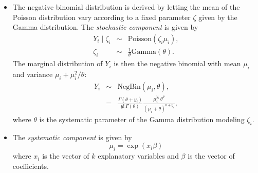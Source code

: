 \begin{itemize}
\item The negative binomial distribution is derived by letting the
  mean of the Poisson distribution vary according to a fixed
  parameter $\zeta$ given by the Gamma distribution. The
  \emph{stochastic component} is given by
   \begin{eqnarray*}
     Y_i \mid \zeta_i & \sim & \textrm{Poisson}(\zeta_i \mu_i),\\
     \zeta_i & \sim & \frac{1}{\theta}\textrm{Gamma}(\theta).
   \end{eqnarray*}
   The marginal distribution of $Y_i$ is then the negative binomial
   with mean $\mu_i$ and variance $\mu_i + \mu_i^2/\theta$:
   \begin{eqnarray*}
   Y_i & \sim & \textrm{NegBin}(\mu_i, \theta), \\
       & = & \frac{\Gamma (\theta + y_i)}{y! \, \Gamma(\theta)} 
             \frac{\mu_i^{y_i} \, \theta^{\theta}}{(\mu_i + \theta)^{\theta + y_i}},
   \end{eqnarray*}
   where $\theta$ is the systematic parameter of the Gamma
   distribution modeling $\zeta_i$.  

 \item The \emph{systematic component} is given by
   \begin{equation*}
     \mu_i = \exp(x_i \beta)
   \end{equation*}
   where $x_i$ is the vector of $k$ explanatory variables and $\beta$ is
   the vector of coefficients.
 \end{itemize}

